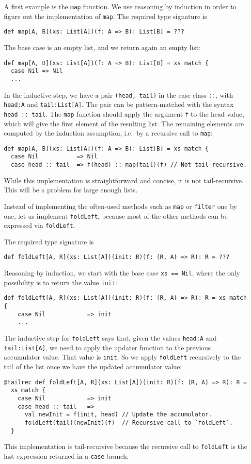 A first example is the \lstinline!map! function. We use reasoning
by induction in order to figure out the implementation of \lstinline!map!.
The required type signature is
\begin{lstlisting}
def map[A, B](xs: List[A])(f: A => B): List[B] = ???
\end{lstlisting}
The base case is an empty list, and we return again an empty list:
\begin{lstlisting}
def map[A, B](xs: List[A])(f: A => B): List[B] = xs match {
  case Nil => Nil
  ...
\end{lstlisting}
In the inductive step, we have a pair \lstinline!(head, tail)! in
the case class \lstinline!::!, with \lstinline!head:A! and \lstinline!tail:List[A]!.
The pair can be pattern-matched with the syntax \lstinline!head :: tail!.
The \lstinline!map! function should apply the argument \lstinline!f!
to the head value, which will give the first element of the resulting
list. The remaining elements are computed by the induction assumption,
i.e.~by a recursive call to \lstinline!map!:
\begin{lstlisting}
def map[A, B](xs: List[A])(f: A => B): List[B] = xs match {
  case Nil           => Nil
  case head :: tail  => f(head) :: map(tail)(f) // Not tail-recursive.
\end{lstlisting}
While this implementation is straightforward and concise, it is not
tail-recursive. This will be a problem for large enough lists.

Instead of implementing the often-used methods such as \lstinline!map!
or \lstinline!filter! one by one, let us implement \lstinline!foldLeft!,
because most of the other methods can be expressed via \lstinline!foldLeft!. 

The required type signature is
\begin{lstlisting}
def foldLeft[A, R](xs: List[A])(init: R)(f: (R, A) => R): R = ???
\end{lstlisting}
Reasoning by induction, we start with the base case \lstinline!xs == Nil!,
where the only possibility is to return the value \lstinline!init!:
\begin{lstlisting}
def foldLeft[A, R](xs: List[A])(init: R)(f: (R, A) => R): R = xs match {
    case Nil            => init
    ...
\end{lstlisting}
The inductive step for \lstinline!foldLeft! says that, given the
values \lstinline!head:A! and \lstinline!tail:List[A]!, we need
to apply the updater function to the previous accumulator value. That
value is \lstinline!init!. So we apply \lstinline!foldLeft! recursively
to the tail of the list once we have the updated accumulator value:
\begin{lstlisting}
@tailrec def foldLeft[A, R](xs: List[A])(init: R)(f: (R, A) => R): R =
  xs match {
    case Nil            => init
    case head :: tail   => 
      val newInit = f(init, head) // Update the accumulator.
      foldLeft(tail)(newInit)(f)  // Recursive call to `foldLeft`.
  }
\end{lstlisting}
This implementation is tail-recursive because the recursive call to
\lstinline!foldLeft! is the last expression returned in a \lstinline!case!
branch.

